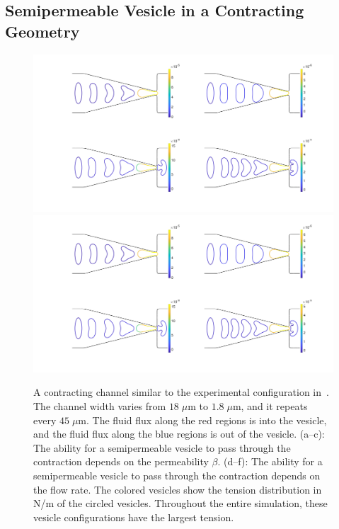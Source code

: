 \documentclass[prb,preprint,showpacs,preprintnumbers,amsmath,amssymb,longbibliography]{revtex4-1}
\newif\ifTikz
\begin{document}
\subsection{Semipermeable Vesicle in a Contracting Geometry} 
\begin{figure}[htp]
  \centering
  \begin{minipage}{0.45\textwidth}
    \centering
  
  \end{minipage}
  \hfill
  \begin{minipage}{0.45\textwidth}
    \centering
    \includegraphics[width=\textwidth]{figures/contractingTensions1.pdf}
    \includegraphics[width=\textwidth]{figures/contractingTensions2.pdf}
    
  \end{minipage}
  \caption{\label{fig:contractingComposite} A contracting channel
  similar to the experimental configuration in~\cite{wu2015critical}.
  The channel width varies from $18\;\mu$m to $1.8\;\mu$m, and it
  repeats every $45\;\mu$m. The fluid flux along the red regions is into
  the vesicle, and the fluid flux along the blue regions is out of the
  vesicle.  (a--c): The ability for a semipermeable vesicle to pass
  through the contraction depends on the permeability $\beta$. (d--f):
  The ability for a semipermeable vesicle to pass through the
  contraction depends on the flow rate. The colored vesicles show the
  tension distribution in N/m of the circled vesicles. Throughout the
  entire simulation, these vesicle configurations have the largest
  tension.}
\end{figure}
\end{document}
